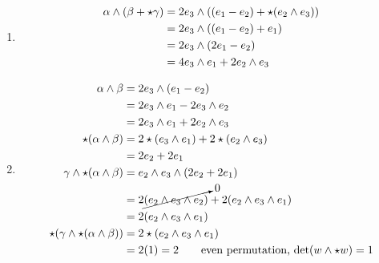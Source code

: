 \documentclass{article}
\begin{document}
\pagebreak
{}\\\\


\begin{enumerate}[label=(\alph*)]
    \item
    \begin{align}
        \alpha \wedge (\beta + \star \gamma)
            &= 2e_3 \wedge((e_1-e_2) + \star(e_2 \wedge e_3)) \notag\\
            &= 2e_3 \wedge((e_1-e_2) + e_1) \notag\\
            &= 2e_3 \wedge(2e_1-e_2) \notag\\
            &= 4 e_3 \wedge e_1 + 2 e_2 \wedge e_3 \notag
    \end{align}

    \item
    \begin{align}
        \alpha \wedge \beta &= 2e_3 \wedge (e_1 - e_2) \notag\\
            &= 2e_3 \wedge e_1 -  2e_3 \wedge e_2 \notag\\
            &= 2e_3 \wedge e_1 +  2e_2 \wedge e_3 \notag\\
        \star(\alpha \wedge \beta) &= 2\star(e_3 \wedge e_1) +  2\star(e_2 \wedge e_3) \notag\\
            &= 2e_2 + 2e_1 \notag\\
        \gamma \wedge \star(\alpha \wedge \beta) &= e_2 \wedge e_3 \wedge (2e_2 + 2e_1) \notag\\
        &= 2\cancelto{0}{(e_2 \wedge e_3 \wedge e_2)} + 2(e_2 \wedge e_3 \wedge e_1) \notag\\
        &= 2(e_2 \wedge e_3 \wedge e_1) \notag\\
        \star(\gamma \wedge \star(\alpha \wedge \beta))
            &= 2 \star(e_2 \wedge e_3 \wedge e_1) \notag\\
            &= 2 (1) = 2 \tag*{even permutation, $\det(w \wedge \star w) = 1$}
    \end{align}
\end{enumerate}


\vspace{1.8cm}
\\\\
\end{document}
